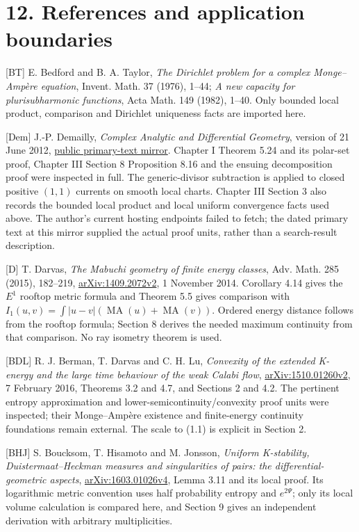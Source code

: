 \documentclass[
  11pt,
]{article}
\begin{document}
\section{12. References and application
boundaries}\label{references-and-application-boundaries}

{[}BT{]} E. Bedford and B. A. Taylor, \emph{The Dirichlet problem for a
complex Monge--Ampère equation}, Invent. Math. 37 (1976), 1--44; \emph{A
new capacity for plurisubharmonic functions}, Acta Math. 149 (1982),
1--40. Only bounded local product, comparison and Dirichlet uniqueness
facts are imported here.

{[}Dem{]} J.-P. Demailly, \emph{Complex Analytic and Differential
Geometry}, version of 21 June 2012,
\href{https://people.math.harvard.edu/~demarco/Math274/Demailly_ComplexAnalyticDiffGeom.pdf}{public
primary-text mirror}. Chapter I Theorem 5.24 and its polar-set proof,
Chapter III Section 8 Proposition 8.16 and the ensuing decomposition
proof were inspected in full. The generic-divisor subtraction is applied
to closed positive \((1,1)\) currents on smooth local charts. Chapter
III Section 3 also records the bounded local product and local uniform
convergence facts used above. The author's current hosting endpoints
failed to fetch; the dated primary text at this mirror supplied the
actual proof units, rather than a search-result description.

{[}D{]} T. Darvas, \emph{The Mabuchi geometry of finite energy classes},
Adv. Math. 285 (2015), 182--219,
\href{https://arxiv.org/pdf/1409.2072v2}{arXiv:1409.2072v2}, 1 November
2014. Corollary 4.14 gives the \(E^1\) rooftop metric formula and
Theorem 5.5 gives comparison with
\(I_1(u,v)=\int|u-v|(\operatorname{MA}(u)+\operatorname{MA}(v))\).
Ordered energy distance follows from the rooftop formula; Section 8
derives the needed maximum continuity from that comparison. No ray
isometry theorem is used.

{[}BDL{]} R. J. Berman, T. Darvas and C. H. Lu, \emph{Convexity of the
extended K-energy and the large time behaviour of the weak Calabi flow},
\href{https://arxiv.org/pdf/1510.01260v2}{arXiv:1510.01260v2}, 7
February 2016, Theorems 3.2 and 4.7, and Sections 2 and 4.2. The
pertinent entropy approximation and lower-semicontinuity/convexity proof
units were inspected; their Monge--Ampère existence and finite-energy
continuity foundations remain external. The scale to (1.1) is explicit
in Section 2.

{[}BHJ{]} S. Boucksom, T. Hisamoto and M. Jonsson, \emph{Uniform
K-stability, Duistermaat--Heckman measures and singularities of pairs:
the differential-geometric aspects},
\href{https://arxiv.org/pdf/1603.01026v4}{arXiv:1603.01026v4}, Lemma
3.11 and its local proof. Its logarithmic metric convention uses half
probability entropy and \(e^{2\Psi}\); only its local volume calculation
is compared here, and Section 9 gives an independent derivation with
arbitrary multiplicities.
\end{document}
